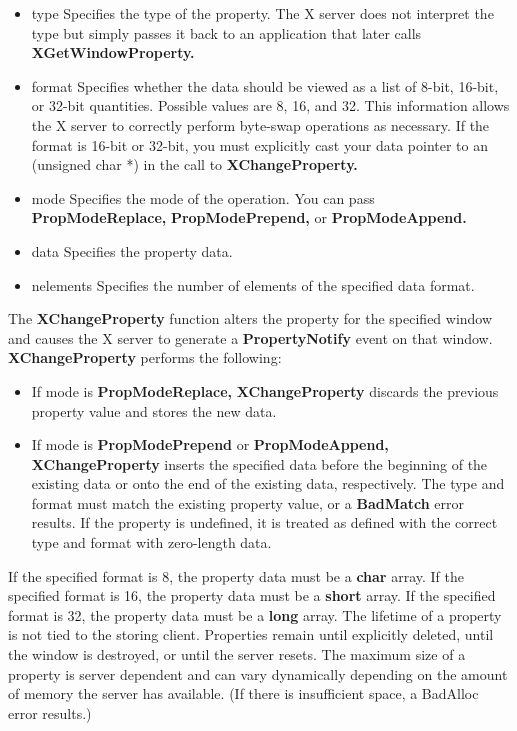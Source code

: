 \documentclass{report}
\begin{document}
\begin{itemize}
\begin{itemize}
            \item type Specifies the type of the property. The X server does not interpret the type but simply passes it back to an application that later calls \textbf{XGetWindowProperty.}
            \item format Specifies whether the data should be viewed as a list of 8-bit, 16-bit, or 32-bit quantities. Possible values are 8, 16, and 32. This information allows the X server to correctly perform byte-swap operations as necessary. If the format is 16-bit or 32-bit, you must explicitly cast your data pointer to an (unsigned char *) in the call to \textbf{XChangeProperty.}
            \item mode Specifies the mode of the operation. You can pass \textbf{PropModeReplace,} \textbf{PropModePrepend,} or \textbf{PropModeAppend.}
            \item data Specifies the property data.
            \item nelements Specifies the number of elements of the specified data format.
        \end{itemize}
        The \textbf{XChangeProperty} function alters the property for the specified window and causes the X server to generate a \textbf{PropertyNotify} event on that window. \textbf{XChangeProperty} performs the following:
        \begin{itemize}
            \item If mode is \textbf{PropModeReplace,} \textbf{XChangeProperty} discards the previous property value and stores the new data.
            \item If mode is \textbf{PropModePrepend} or \textbf{PropModeAppend,} \textbf{XChangeProperty} inserts the specified data before the beginning of the existing data or onto the end of the existing data, respectively. The type and format must match the existing property value, or a \textbf{BadMatch} error results. If the property is undefined, it is treated as defined with the correct type and format with zero-length data.
        \end{itemize}
        If the specified format is 8, the property data must be a \textbf{char} array. If the specified format is 16, the property data must be a \textbf{short} array. If the specified format is 32, the property data must be a \textbf{long} array.
        \bigbreak \noindent 
        The lifetime of a property is not tied to the storing client. Properties remain until explicitly deleted, until the window is destroyed, or until the server resets. The maximum size of a property is server dependent and can vary dynamically depending on the amount of memory the server has available. (If there is insufficient space, a BadAlloc error results.)

\end{itemize}
\end{document}
